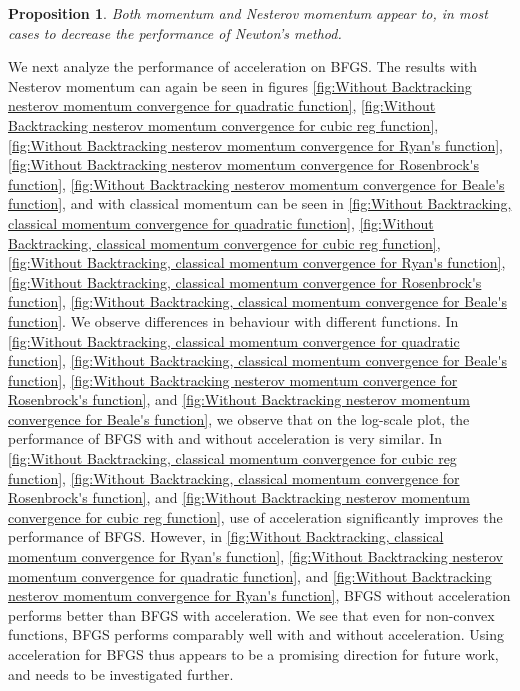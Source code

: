 \documentclass{article}
\newtheorem{prop}{Proposition}
\begin{document}
\begin{prop}
	Both momentum and Nesterov momentum appear to, in most cases to decrease the performance of Newton's method. 
\end{prop}

We next analyze the performance of acceleration on BFGS. The results with Nesterov momentum can again be seen in	figures \ref{fig:Without Backtracking nesterov momentum convergence for quadratic function},
\ref{fig:Without Backtracking nesterov momentum convergence for cubic reg function},
\ref{fig:Without Backtracking nesterov momentum convergence for Ryan's function},
\ref{fig:Without Backtracking nesterov momentum convergence for Rosenbrock's function},
\ref{fig:Without Backtracking nesterov momentum convergence for Beale's function}, and with classical momentum can be seen in \ref{fig:Without Backtracking, classical momentum convergence for quadratic function},
\ref{fig:Without Backtracking, classical momentum convergence for cubic reg function},
\ref{fig:Without Backtracking, classical momentum convergence for Ryan's function},
\ref{fig:Without Backtracking, classical momentum convergence for Rosenbrock's function},
\ref{fig:Without Backtracking, classical momentum convergence for Beale's function}. We observe differences in behaviour with different functions. In \ref{fig:Without Backtracking, classical momentum convergence for quadratic function}, \ref{fig:Without Backtracking, classical momentum convergence for Beale's function}, \ref{fig:Without Backtracking nesterov momentum convergence for Rosenbrock's function}, and \ref{fig:Without Backtracking nesterov momentum convergence for Beale's function}, we observe that on the log-scale plot, the performance of BFGS with and without acceleration is very similar. In \ref{fig:Without Backtracking, classical momentum convergence for cubic reg function}, \ref{fig:Without Backtracking, classical momentum convergence for Rosenbrock's function}, and \ref{fig:Without Backtracking nesterov momentum convergence for cubic reg function}, use of acceleration significantly improves the performance of BFGS. However, in \ref{fig:Without Backtracking, classical momentum convergence for Ryan's function}, \ref{fig:Without Backtracking nesterov momentum convergence for quadratic function}, and \ref{fig:Without Backtracking nesterov momentum convergence for Ryan's function}, BFGS without acceleration performs better than BFGS with acceleration. We see that even for non-convex functions, BFGS performs comparably well with and without acceleration. Using acceleration for BFGS thus appears to be a promising direction for future work, and needs to be investigated further.
\end{document}
